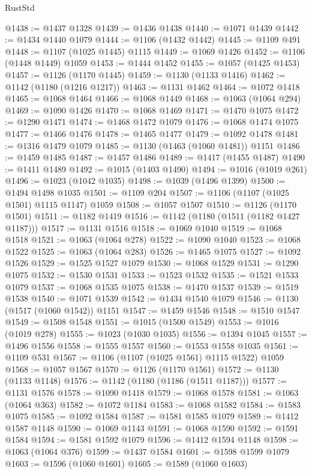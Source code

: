 \begin{lexlean}{RustStd}
\begin{coremodule}
@1438 := @1437 @1328
@1439 := @1436 @1438
@1440 := @1071 @1439
@1442 := @1434 @1440 @1079
@1444 := @1106 (@1432 @1442)
@1445 := @1109 @491
@1448 := @1107 (@1025 @1445) @1115
@1449 := @1069 @1426
@1452 := @1106 (@1448 @1449) @1059
@1453 := @1444 @1452
@1455 := @1057 (@1425 @1453)
@1457 := @1126 (@1170 @1445)
@1459 := @1130 (@1133 @1416)
@1462 := @1142 (@1180 (@1216 @1217))
@1463 := @1131 @1462
@1464 := @1072 @1418
@1465 := @1068 @1464
@1466 := @1068 @1449
@1468 := @1063 (@1064 @294)
@1469 := @1090 @1426
@1470 := @1068 @1469
@1471 := @1470 @1075
@1472 := @1290 @1471
@1474 := @1468 @1472 @1079
@1476 := @1068 @1474 @1075
@1477 := @1466 @1476
@1478 := @1465 @1477
@1479 := @1092 @1478
@1481 := @1316 @1479 @1079
@1485 := @1130 (@1463 (@1060 @1481)) @1151
@1486 := @1459 @1485
@1487 := @1457 @1486
@1489 := @1417 (@1455 @1487)
@1490 := @1411 @1489
@1492 := @1015 (@1403 @1490)
@1494 := @1016 (@1019 @261)
@1496 := @1023 (@1042 @1035)
@1498 := @1039 (@1496 @1399)
@1500 := @1494 @1498 @1035
@1501 := @1109 @204
@1507 := @1106 (@1107 (@1025 @1501) @1115 @1147) @1059
@1508 := @1057 @1507
@1510 := @1126 (@1170 @1501)
@1511 := @1182 @1419
@1516 := @1142 (@1180 (@1511 (@1182 @1427 @1187)))
@1517 := @1131 @1516
@1518 := @1069 @1040
@1519 := @1068 @1518
@1521 := @1063 (@1064 @278)
@1522 := @1090 @1040
@1523 := @1068 @1522
@1525 := @1063 (@1064 @283)
@1526 := @1465 @1075
@1527 := @1092 @1526
@1529 := @1525 @1527 @1079
@1530 := @1068 @1529
@1531 := @1290 @1075
@1532 := @1530 @1531
@1533 := @1523 @1532
@1535 := @1521 @1533 @1079
@1537 := @1068 @1535 @1075
@1538 := @1470 @1537
@1539 := @1519 @1538
@1540 := @1071 @1539
@1542 := @1434 @1540 @1079
@1546 := @1130 (@1517 (@1060 @1542)) @1151
@1547 := @1459 @1546
@1548 := @1510 @1547
@1549 := @1508 @1548
@1551 := @1015 (@1500 @1549)
@1553 := @1016 (@1019 @278)
@1555 := @1023 (@1030 @1035)
@1556 := @1394 @1045
@1557 := @1496 @1556
@1558 := @1555 @1557
@1560 := @1553 @1558 @1035
@1561 := @1109 @531
@1567 := @1106 (@1107 (@1025 @1561) @1115 @1522) @1059
@1568 := @1057 @1567
@1570 := @1126 (@1170 @1561)
@1572 := @1130 (@1133 @1148)
@1576 := @1142 (@1180 (@1186 (@1511 @1187)))
@1577 := @1131 @1576
@1578 := @1090 @1418
@1579 := @1068 @1578
@1581 := @1063 (@1064 @363)
@1582 := @1072 @1184
@1583 := @1068 @1582
@1584 := @1583 @1075
@1585 := @1092 @1584
@1587 := @1581 @1585 @1079
@1589 := @1412 @1587 @1148
@1590 := @1069 @1143
@1591 := @1068 @1590
@1592 := @1591 @1584
@1594 := @1581 @1592 @1079
@1596 := @1412 @1594 @1148
@1598 := @1063 (@1064 @376)
@1599 := @1437 @1584
@1601 := @1598 @1599 @1079
@1603 := @1596 (@1060 @1601)
@1605 := @1589 (@1060 @1603)

\end{coremodule}
\end{lexlean}
